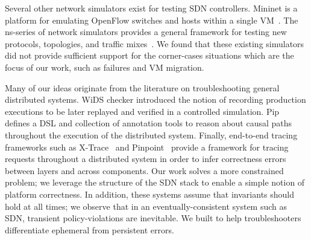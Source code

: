 Several other network simulators exist for testing SDN controllers. Mininet is a 
platform for emulating OpenFlow switches and hosts within a single
 VM~\cite{Lantz:2010:NLR:1868447.1868466}. The ns-series of network simulators
provides a general framework for testing new protocols, topologies,
and traffic mixes~\cite{ns3}. We found that these existing simulators did
not provide sufficient support for the corner-cases situations which are the
focus of our work, such as failures and VM migration.

Many of our ideas originate from the literature on troubleshooting general
distributed systems. WiDS checker introduced the notion of recording
production executions to be later replayed and verified in a controlled simulation.
Pip~\cite{pip} defines a DSL and collection of annotation tools to
reason about causal paths throughout the execution of the
distributed system. Finally, end-to-end tracing
frameworks such as X-Trace~\cite{Fonseca:2007:XPN:1973430.1973450} and 
Pinpoint~\cite{Chen02pinpoint:problem} provide a framework for tracing requests throughout 
a distributed system in order to infer correctness errors between layers and
across components. Our work solves a more constrained problem; we leverage
the structure of the SDN stack to enable a simple notion of platform
correctness. In addition, these systems assume that invariants should hold at
all times; we observe that in an eventually-consistent system such as SDN,
transient policy-violations are inevitable. We built \simulator{} to help troubleshooters
differentiate ephemeral from persistent errors. 


